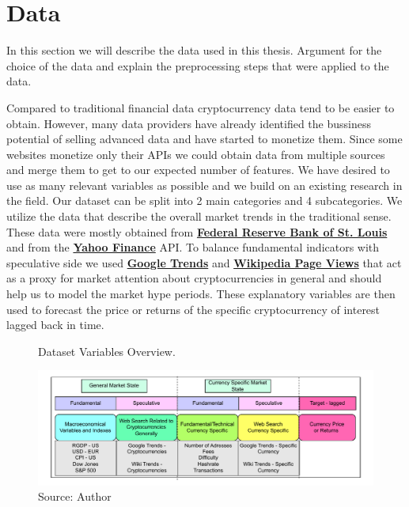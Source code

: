 \chapter{Data}
\label{chap:three}

In this section
we will describe the data used in this thesis. 
Argument for the choice of the data and 
explain the preprocessing steps that were applied to the data.

Compared to traditional financial data cryptocurrency data tend to be easier
to obtain. However, many data providers have already identified the bussiness 
potential of selling advanced data and have started to monetize them. Since some
websites monetize only their APIs we could obtain data from 
multiple sources and merge them to get to our expected number of features. We have
desired to use as many relevant variables as possible and we build on
an existing research in the field.
Our dataset can be split into 2 main categories and 4 subcategories.
We utilize the data that describe the overall market trends in the traditional
sense. These data were mostly obtained from \textbf{\href{https://fred.stlouisfed.org/}{Federal Reserve Bank of St. Louis}}
and from the 
\textbf{\href{https://finance.yahoo.com/markets/}{Yahoo Finance}} API.
To balance fundamental indicators with speculative side we used \textbf{\href{https://trends.google.com/trends/}{Google Trends}}
and \textbf{\href{https://pageviews.wmcloud.org/}{Wikipedia Page Views}} 
that act as a proxy for market attention about cryptocurrencies in general 
and should help us to model the market hype periods. These explanatory
variables are then used to forecast the price or returns of the specific cryptocurrency
of interest lagged back in time.

\begin{figure}[!h]
    \centering
    \caption{Dataset Variables Overview.}
    \includegraphics[width=1\textwidth]{Figures/dataset_description.drawio.pdf}
    \caption*{Source: Author}    
    \label{fig:dataset_description}
\end{figure}


